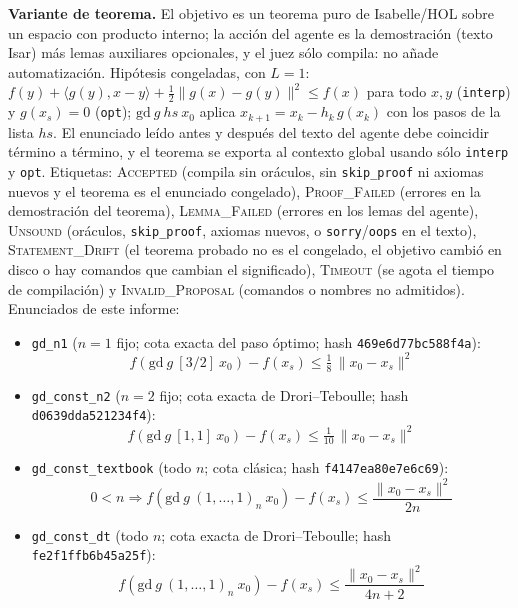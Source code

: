 \documentclass[11pt,a4paper]{article}
\begin{document}
\textbf{Variante de teorema.} El objetivo es un teorema puro de Isabelle/HOL sobre un espacio con producto interno; la acción del agente es la demostración (texto Isar) más lemas auxiliares opcionales, y el juez sólo compila: no añade automatización. Hipótesis congeladas, con $L = 1$: $f(y) + \langle g(y), x - y\rangle + \tfrac12\|g(x) - g(y)\|^2 \le f(x)$ para todo $x, y$ (\texttt{interp}) y $g(x_s) = 0$ (\texttt{opt}); $\mathrm{gd}\ g\ hs\ x_0$ aplica $x_{k+1} = x_k - h_k\, g(x_k)$ con los pasos de la lista $hs$. El enunciado leído antes y después del texto del agente debe coincidir término a término, y el teorema se exporta al contexto global usando sólo \texttt{interp} y \texttt{opt}. Etiquetas: \textsc{Accepted} (compila sin oráculos, sin \texttt{skip\_proof} ni axiomas nuevos y el teorema es el enunciado congelado), \textsc{Proof\_Failed} (errores en la demostración del teorema), \textsc{Lemma\_Failed} (errores en los lemas del agente), \textsc{Unsound} (oráculos, \texttt{skip\_proof}, axiomas nuevos, o \texttt{sorry}/\texttt{oops} en el texto), \textsc{Statement\_Drift} (el teorema probado no es el congelado, el objetivo cambió en disco o hay comandos que cambian el significado), \textsc{Timeout} (se agota el tiempo de compilación) y \textsc{Invalid\_Proposal} (comandos o nombres no admitidos). Enunciados de este informe:
\begin{itemize}
  \item \texttt{gd\_\allowbreak{}n1} ($n = 1$ fijo; cota exacta del paso óptimo; hash \texttt{469e6d77bc588f4a}):
  \[ f(\mathrm{gd}\ g\ [3/2]\ x_0) - f(x_s) \le \tfrac{1}{8}\,\|x_0 - x_s\|^2 \]
  \item \texttt{gd\_\allowbreak{}const\_\allowbreak{}n2} ($n = 2$ fijo; cota exacta de Drori--Teboulle; hash \texttt{d0639dda521234f4}):
  \[ f(\mathrm{gd}\ g\ [1, 1]\ x_0) - f(x_s) \le \tfrac{1}{10}\,\|x_0 - x_s\|^2 \]
  \item \texttt{gd\_\allowbreak{}const\_\allowbreak{}textbook} (todo $n$; cota clásica; hash \texttt{f4147ea80e7e6c69}):
  \[ 0 < n \Longrightarrow f(\mathrm{gd}\ g\ (1,\dots,1)_n\ x_0) - f(x_s) \le \frac{\|x_0 - x_s\|^2}{2n} \]
  \item \texttt{gd\_\allowbreak{}const\_\allowbreak{}dt} (todo $n$; cota exacta de Drori--Teboulle; hash \texttt{fe2f1ffb6b45a25f}):
  \[ f(\mathrm{gd}\ g\ (1,\dots,1)_n\ x_0) - f(x_s) \le \frac{\|x_0 - x_s\|^2}{4n + 2} \]
\end{itemize}
\end{document}
